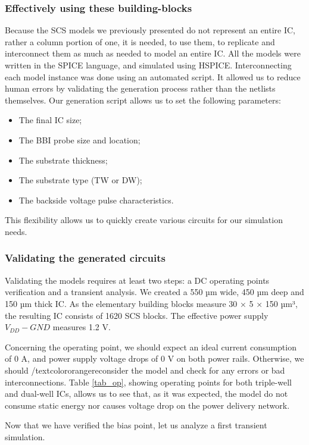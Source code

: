 		\subsubsection{Effectively using these building-blocks}
		Because the SCS models we previously presented do not represent an entire IC, rather a column portion of one, it is needed, to use them, to replicate and interconnect them as much as needed to model an entire IC.
		All the models were written in the SPICE language, and simulated using HSPICE.
		Interconnecting each model instance was done using an automated script.
		It allowed us to reduce human errors by validating the generation process rather than the netlists themselves.
		Our generation script allows us to set the following parameters:
		\begin{itemize}
			\item The final IC size;
			\item The BBI probe size and location;
			\item The substrate thickness;
			\item The substrate type (TW or DW);
			\item The backside voltage pulse characteristics.
		\end{itemize}
		This flexibility allows us to quickly create various circuits for our simulation needs.
		
		\subsubsection{Validating the generated circuits}
		Validating the models requires at least two steps: a DC operating points verification and a transient analysis.
		We created a 550 µm wide, 450 µm deep and 150 µm thick IC.
		As the elementary building blocks measure 30 × 5 × 150 µm³, the resulting IC consists of 1620 SCS blocks.
		The effective power supply $V_{DD} - GND$ measures 1.2 V.
		
		Concerning the operating point, we should expect an ideal current consumption of 0 A, and power supply voltage drops of 0 V on both power rails.
		Otherwise, we should /textcolor{orange}{reconsider} the model and check for any errors or bad interconnections.
		Table \ref{tab_op}, showing operating points for both triple-well and dual-well ICs, allows us to see that, as it was expected, the model do not consume static energy nor causes voltage drop on the power delivery network.
		
		Now that we have verified the bias point, let us analyze a first transient simulation.
		
